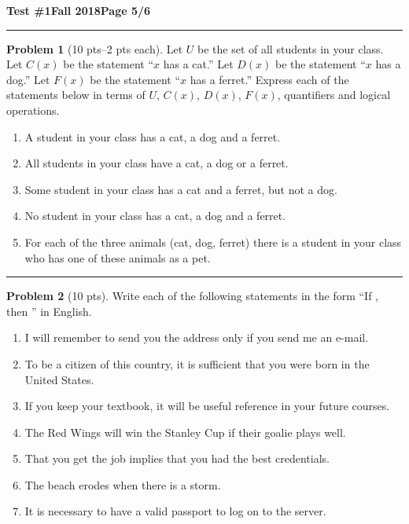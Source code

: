 \documentclass[11pt]{article}
\theoremstyle{definition}
\newtheorem{problem}{Problem}
\begin{document}
\hfill{\large\bf Test \#1}\hfill{\large\bf Fall 2018}\hfill{\large\bf Page 5/6}\hrule

\bigskip

\begin{problem}[10 pts--2 pts each]
  Let $U$ be the set of all students in your class.  Let $C(x)$ be the statement ``$x$ has a cat.'' Let $D(x)$ be the
  statement ``$x$ has a dog.'' Let $F(x)$ be the statement ``$x$ has a ferret.''  Express each of the statements below
  in terms of $U$, $C(x)$, $D(x)$, $F(x)$, quantifiers and logical operations.
  \begin{enumerate}
  \item A student in your class has a cat, a dog and a ferret.
    \vspace{1cm}
  \item All students in your class have a cat, a dog or a ferret.
    \vspace{1cm}
  \item Some student in your class has a cat and a ferret, but not a dog.
    \vspace{1cm}
  \item No student in your class has a cat, a dog and a ferret.
    \vspace{1cm}
  \item For each of the three animals (cat, dog, ferret) there is a student in your class who has one of these animals
    as a pet.
    \vspace{1.5cm}
  \end{enumerate}
\end{problem}
\hrule

\begin{problem}[10 pts]
  Write each of the following statements in the form ``If \makebox[1cm]{\hrulefill}, then \makebox[1cm]{\hrulefill}'' in
  English.
  \begin{enumerate}
  \item I will remember to send you the address only if you send me an e-mail.
    \vspace{1cm}
  \item To be a citizen of this country, it is sufficient that you were born in the United States.
    \vspace{1cm}
  \item If you keep your textbook, it will be useful reference in your future courses.
    \vspace{1cm}
  \item The Red Wings will win the Stanley Cup if their goalie plays well.
    \vspace{1cm}
  \item That you get the job implies that you had the best credentials.
    \vspace{1cm}
  \item The beach erodes when there is a storm.
    \vspace{1cm}
  \item It is necessary to have a valid passport to log on to the server.
  \end{enumerate}
\end{problem}
\newpage
\end{document}
